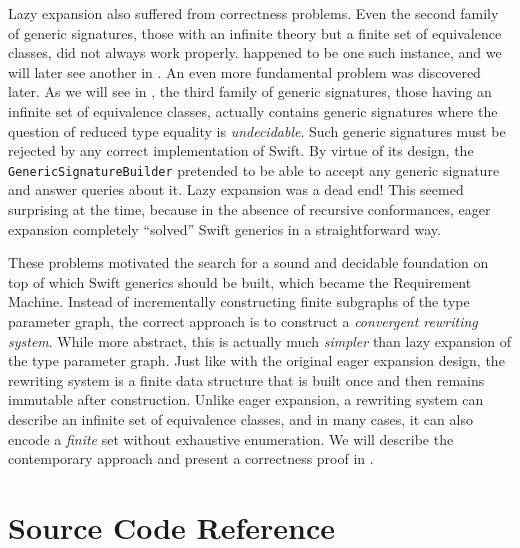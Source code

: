 \documentclass[../generics]{subfiles}
\begin{document}
Lazy expansion also suffered from correctness problems. Even the second family of generic signatures, those with an infinite theory but a finite set of equivalence classes, did not always work properly.  happened to be one such instance, and we will later see another in . An even more fundamental problem was discovered later. As we will see in , the third family of generic signatures, those having an infinite set of equivalence classes, actually contains generic signatures where the question of reduced type equality is \emph{undecidable}. Such generic signatures must be rejected by any correct implementation of Swift. By virtue of its design, the \texttt{GenericSignatureBuilder} pretended to be able to accept any generic signature and answer queries about it. Lazy expansion was a dead end! This seemed surprising at the time, because in the absence of recursive conformances, eager expansion completely ``solved'' Swift generics in a straightforward way.

These problems motivated the search for a sound and decidable foundation on top of which Swift generics should be built, which became the Requirement Machine. Instead of incrementally constructing finite subgraphs of the type parameter graph, the correct approach is to construct a \emph{convergent rewriting system}. While more abstract, this is actually much \emph{simpler} than lazy expansion of the type parameter graph. Just like with the original eager expansion design, the rewriting system is a finite data structure that is built once and then remains immutable after construction. Unlike eager expansion, a rewriting system can describe an infinite set of equivalence classes, and in many cases, it can also encode a \emph{finite} set without exhaustive enumeration. We will describe the contemporary approach and present a correctness proof in .



\section{Source Code Reference}
\end{document}
